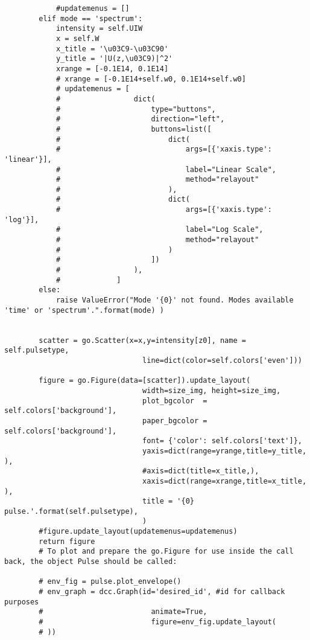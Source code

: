 \begin{verbatim}
            #updatemenus = []
        elif mode == 'spectrum':
            intensity = self.UIW
            x = self.W
            x_title = '\u03C9-\u03C90'
            y_title = '|U(z,\u03C9)|^2'
            xrange = [-0.1E14, 0.1E14]
            # xrange = [-0.1E14+self.w0, 0.1E14+self.w0]
            # updatemenus = [
            #                 dict(
            #                     type="buttons",
            #                     direction="left",
            #                     buttons=list([
            #                         dict(
            #                             args=[{'xaxis.type': 'linear'}],
            #                             label="Linear Scale",
            #                             method="relayout"
            #                         ),
            #                         dict(
            #                             args=[{'xaxis.type': 'log'}],
            #                             label="Log Scale",
            #                             method="relayout"
            #                         )
            #                     ])
            #                 ),
            #             ]
        else:
            raise ValueError("Mode '{0}' not found. Modes available 'time' or 'spectrum'.".format(mode) )
        

        scatter = go.Scatter(x=x,y=intensity[z0], name = self.pulsetype,
                                line=dict(color=self.colors['even']))
        
        figure = go.Figure(data=[scatter]).update_layout(
                                width=size_img, height=size_img,
                                plot_bgcolor  = self.colors['background'],
                                paper_bgcolor = self.colors['background'],
                                font= {'color': self.colors['text']},
                                yaxis=dict(range=yrange,title=y_title, ), 
                                #axis=dict(title=x_title,), 
                                xaxis=dict(range=xrange,title=x_title, ), 
                                title = '{0} pulse.'.format(self.pulsetype),
                                )
        #figure.update_layout(updatemenus=updatemenus)
        return figure
        # To plot and prepare the go.Figure for use inside the call back, the object Pulse should be called:

        # env_fig = pulse.plot_envelope()
        # env_graph = dcc.Graph(id='desired_id', #id for callback purposes
        #                         animate=True,
        #                         figure=env_fig.update_layout(
        # ))        


\end{verbatim}
